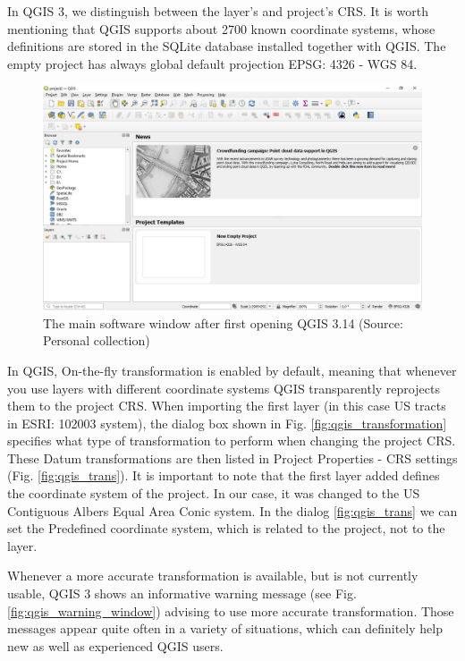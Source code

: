 \documentclass[a4paper,10pt,twoside]{article}
\begin{document}
In QGIS 3, we distinguish between the layer's and project's CRS. It is worth mentioning that QGIS supports about 2700 known coordinate systems, whose definitions are stored in the SQLite database installed together with QGIS. The empty project has always global default projection EPSG: 4326 - WGS 84.

\vspace{0.3cm}
\begin{figure}[hbt!] 
\begin{center}
\includegraphics[width=17cm]{../pictures/qgis_first_window.JPG} 
\caption[The main software window after first opening QGIS 3.14]{The main software window after first opening QGIS 3.14 (Source: Personal collection)}
\label{fig:qgis_first_window}
\end{center}
\end{figure}

\noindent In QGIS, On-the-fly transformation is enabled by default, meaning that whenever you use layers with different coordinate systems QGIS transparently reprojects them to the project CRS. When importing the first layer (in this case US tracts in ESRI: 102003 system), the dialog box shown in Fig. \ref{fig:qgis_transformation} specifies what type of transformation to perform when changing the project CRS. These Datum transformations are then listed in Project Properties - CRS settings (Fig. \ref{fig:qgis_trans}). It is important to note that the first layer added defines the coordinate system of the project. In our case, it was changed to the US Contiguous Albers Equal Area Conic system. In the dialog \ref{fig:qgis_trans} we can set the Predefined coordinate system, which is related to the project, not to the layer.

Whenever a more accurate transformation is available, but is not currently usable, QGIS 3 shows an informative warning message (see Fig. \ref{fig:qgis_warning_window}) advising to use more accurate transformation. Those messages appear quite often in a variety of situations, which can definitely help new as well as experienced QGIS users.
\end{document}
